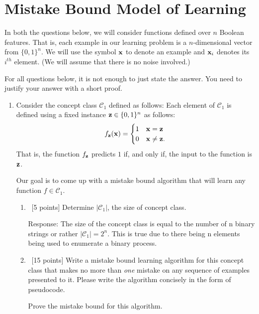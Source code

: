 \section{Mistake Bound Model of Learning}\label{sec:q3}

In both the questions below, we will consider functions defined over
$n$ Boolean features. That is, each example in our learning problem
is a $n$-dimensional vector from $\{0, 1\}^n$. We will use the
symbol ${\bf x}$ to denote an example and ${\bf x}_i$ denotes its $i^{th}$
element.  (We will assume that there is no noise involved.)

For all questions below, it is not enough to just state the
answer. You need to justify your answer with a short proof.


\begin{enumerate}
\item Consider the concept class $\mathcal{C}_1$ defined as follows:
  Each element of $\mathcal{C}_1$ is defined using a fixed instance
  ${\bf z} \in \{0, 1\}^n$ as follows:
  \begin{equation*}
    f_{\bf z}({\bf x}) = \begin{cases}
      1 & {\bf x} = {\bf z} \\
      0 & {\bf x} \ne {\bf z}.
    \end{cases}
  \end{equation*}
  That is, the function $f_{\bf z}$ predicts $1$ if, and only if, the
  input to the function is ${\bf z}$.

  Our goal is to come up with a mistake bound algorithm that will
  learn any function $f\in\mathcal{C}_1$.
  
  \begin{enumerate}
  \item~[5 points] Determine $\vert\mathcal{C}_1\vert$, the size of
    concept class.
    
    Response:\newline
    The size of the concept class is equal to the number of n binary strings or rather $\vert\mathcal{C}_1\vert=2^n$. This is true due to there being n elements being used to enumerate a binary process.
    
  \item~[15 points] Write a mistake bound learning algorithm for
    this concept class that makes no more than {\em one} mistake on
    any sequence of examples presented to it. Please write the
    algorithm concisely in the form of pseudocode.

    Prove the mistake bound for this algorithm.


\end{enumerate}
\end{enumerate}
